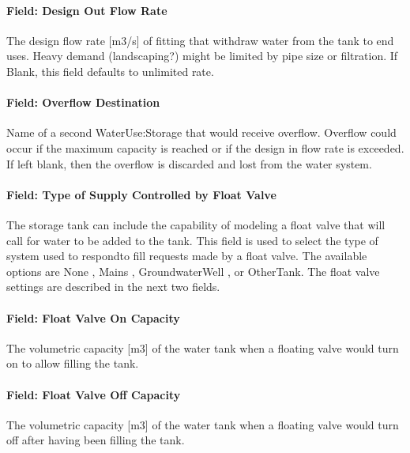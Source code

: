 \paragraph{Field: Design Out Flow Rate}\label{field-design-out-flow-rate}

The design flow rate {[}m3/s{]} of fitting that withdraw water from the tank to end uses. Heavy demand (landscaping?) might be limited by pipe size or filtration. If Blank, this field defaults to unlimited rate.

\paragraph{Field: Overflow Destination}\label{field-overflow-destination}

Name of a second WaterUse:Storage that would receive overflow. Overflow could occur if the maximum capacity is reached or if the design in flow rate is exceeded. If left blank, then the overflow is discarded and lost from the water system.

\paragraph{Field: Type of Supply Controlled by Float Valve}\label{field-type-of-supply-controlled-by-float-valve}

The storage tank can include the capability of modeling a float valve that will call for water to be added to the tank. This field is used to select the type of system used to respondto fill requests made by a float valve. The available options are None , Mains , GroundwaterWell , or OtherTank. The float valve settings are described in the next two fields.

\paragraph{Field: Float Valve On Capacity}\label{field-float-valve-on-capacity}

The volumetric capacity {[}m3{]} of the water tank when a floating valve would turn on to allow filling the tank.

\paragraph{Field: Float Valve Off Capacity}\label{field-float-valve-off-capacity}

The volumetric capacity {[}m3{]} of the water tank when a floating valve would turn off after having been filling the tank.

